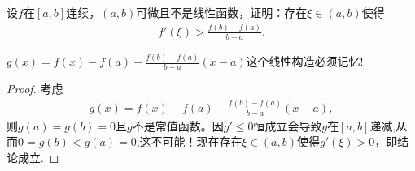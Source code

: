 \documentclass[../../main.tex]{subfiles}%
\begin{document}
\begin{example}
设$f$在$[a,b]$连续，$(a,b)$可微且不是线性函数，证明：存在$\xi\in(a,b)$使得
\begin{align*}
f'(\xi) > \frac{f(b) - f(a)}{b - a}.
\end{align*}
\end{example}
\begin{note}
$g(x) = f(x) - f(a)- \frac{f(b) - f(a)}{b - a}(x - a)$这个线性构造必须记忆!
\end{note}
\begin{proof}
考虑
\begin{align*}
g(x) = f(x) - f(a)- \frac{f(b) - f(a)}{b - a}(x - a) ,
\end{align*}
则$g(a) = g(b) = 0$且$g$不是常值函数。因$g'\leqslant  0$恒成立会导致$g$在$[a,b]$递减,从而$0=g(b)<g(a)=0$,这不可能！现在存在$\xi\in(a,b)$使得$g'(\xi) > 0$，即结论成立.
\end{proof}
\end{document}
